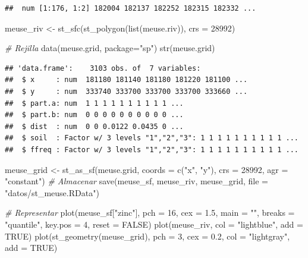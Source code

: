\documentclass[
  spanish,
]{book}
\newenvironment{Shaded}{\begin{snugshade}}{\end{snugshade}}
\newcommand{\AttributeTok}[1]{\textcolor[rgb]{0.77,0.63,0.00}{#1}}
\newcommand{\CommentTok}[1]{\textcolor[rgb]{0.56,0.35,0.01}{\textit{#1}}}
\newcommand{\ConstantTok}[1]{\textcolor[rgb]{0.00,0.00,0.00}{#1}}
\newcommand{\DecValTok}[1]{\textcolor[rgb]{0.00,0.00,0.81}{#1}}
\newcommand{\FloatTok}[1]{\textcolor[rgb]{0.00,0.00,0.81}{#1}}
\newcommand{\FunctionTok}[1]{\textcolor[rgb]{0.00,0.00,0.00}{#1}}
\newcommand{\NormalTok}[1]{#1}
\newcommand{\OtherTok}[1]{\textcolor[rgb]{0.56,0.35,0.01}{#1}}
\newcommand{\StringTok}[1]{\textcolor[rgb]{0.31,0.60,0.02}{#1}}
\theoremstyle{break}
\begin{document}
\begin{verbatim}
##  num [1:176, 1:2] 182004 182137 182252 182315 182332 ...
\end{verbatim}

\begin{Shaded}
\begin{Highlighting}[]
\NormalTok{meuse\_riv }\OtherTok{\textless{}{-}} \FunctionTok{st\_sfc}\NormalTok{(}\FunctionTok{st\_polygon}\NormalTok{(}\FunctionTok{list}\NormalTok{(meuse.riv)), }\AttributeTok{crs =} \DecValTok{28992}\NormalTok{)}

\CommentTok{\# Rejilla}
\FunctionTok{data}\NormalTok{(meuse.grid, }\AttributeTok{package=}\StringTok{"sp"}\NormalTok{)}
\FunctionTok{str}\NormalTok{(meuse.grid)}
\end{Highlighting}
\end{Shaded}

\begin{verbatim}
## 'data.frame':    3103 obs. of  7 variables:
##  $ x     : num  181180 181140 181180 181220 181100 ...
##  $ y     : num  333740 333700 333700 333700 333660 ...
##  $ part.a: num  1 1 1 1 1 1 1 1 1 1 ...
##  $ part.b: num  0 0 0 0 0 0 0 0 0 0 ...
##  $ dist  : num  0 0 0.0122 0.0435 0 ...
##  $ soil  : Factor w/ 3 levels "1","2","3": 1 1 1 1 1 1 1 1 1 1 ...
##  $ ffreq : Factor w/ 3 levels "1","2","3": 1 1 1 1 1 1 1 1 1 1 ...
\end{verbatim}

\begin{Shaded}
\begin{Highlighting}[]
\NormalTok{meuse\_grid }\OtherTok{\textless{}{-}} \FunctionTok{st\_as\_sf}\NormalTok{(meuse.grid, }\AttributeTok{coords =} \FunctionTok{c}\NormalTok{(}\StringTok{"x"}\NormalTok{, }\StringTok{"y"}\NormalTok{), }
                       \AttributeTok{crs =} \DecValTok{28992}\NormalTok{, }\AttributeTok{agr =} \StringTok{"constant"}\NormalTok{)}
\CommentTok{\# Almacenar}
\FunctionTok{save}\NormalTok{(meuse\_sf, meuse\_riv, meuse\_grid, }\AttributeTok{file =} \StringTok{"datos/st\_meuse.RData"}\NormalTok{)}

\CommentTok{\# Representar}
\FunctionTok{plot}\NormalTok{(meuse\_sf[}\StringTok{"zinc"}\NormalTok{], }\AttributeTok{pch =} \DecValTok{16}\NormalTok{, }\AttributeTok{cex =} \FloatTok{1.5}\NormalTok{, }\AttributeTok{main =} \StringTok{""}\NormalTok{,}
     \AttributeTok{breaks =} \StringTok{"quantile"}\NormalTok{, }\AttributeTok{key.pos =} \DecValTok{4}\NormalTok{, }\AttributeTok{reset =} \ConstantTok{FALSE}\NormalTok{)}
\FunctionTok{plot}\NormalTok{(meuse\_riv, }\AttributeTok{col =} \StringTok{"lightblue"}\NormalTok{, }\AttributeTok{add =} \ConstantTok{TRUE}\NormalTok{)}
\FunctionTok{plot}\NormalTok{(}\FunctionTok{st\_geometry}\NormalTok{(meuse\_grid), }\AttributeTok{pch =} \DecValTok{3}\NormalTok{, }\AttributeTok{cex =} \FloatTok{0.2}\NormalTok{, }\AttributeTok{col =} \StringTok{"lightgray"}\NormalTok{, }\AttributeTok{add =} \ConstantTok{TRUE}\NormalTok{)}
\end{Highlighting}
\end{Shaded}
\end{document}
